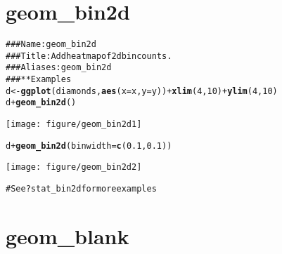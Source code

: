 \documentclass[a4paper,titlepage]{tufte-handout}\usepackage{graphicx, color}
\makeatletter
\def\maxwidth{ %
  \ifdim\Gin@nat@width>\linewidth
    \linewidth
  \else
    \Gin@nat@width
  \fi
}
\newcommand{\hlfunctioncall}[1]{\textcolor[rgb]{0.501960784313725,0,0.329411764705882}{\textbf{#1}}}%
\newcommand{\hlcomment}[1]{\textcolor[rgb]{0.180392156862745,0.6,0.341176470588235}{#1}}%
\newenvironment{kframe}{%
 \def\at@end@of@kframe{}%
 \ifinner\ifhmode%
  \def\at@end@of@kframe{\end{minipage}}%
  \begin{minipage}{\columnwidth}%
 \fi\fi%
 \def\FrameCommand##1{\hskip\@totalleftmargin \hskip-\fboxsep
 \colorbox{shadecolor}{##1}\hskip-\fboxsep
     \hskip-\linewidth \hskip-\@totalleftmargin \hskip\columnwidth}%
 \MakeFramed {\advance\hsize-\width
   \@totalleftmargin\z@ \linewidth\hsize
   \@setminipage}}%
 {\par\unskip\endMakeFramed%
 \at@end@of@kframe}
\newenvironment{knitrout}{}{} %
\makeatother
\begin{document}
\section{geom\_bin2d}

\begin{knitrout}
\color{fgcolor}\begin{kframe}
\begin{alltt}
\hlcomment{### Name: geom_bin2d}
\hlcomment{### Title: Add heatmap of 2d bin counts.}
\hlcomment{### Aliases: geom_bin2d}
\hlcomment{### ** Examples}
d <- \hlfunctioncall{ggplot}(diamonds, \hlfunctioncall{aes}(x = x, y = y)) + \hlfunctioncall{xlim}(4,10) + \hlfunctioncall{ylim}(4,10)
d + \hlfunctioncall{geom_bin2d}()
\end{alltt}
\end{kframe}\texttt{[image: figure/geom\_bin2d1]} \begin{kframe}\begin{alltt}
d + \hlfunctioncall{geom_bin2d}(binwidth = \hlfunctioncall{c}(0.1, 0.1))
\end{alltt}
\end{kframe}\texttt{[image: figure/geom\_bin2d2]} \begin{kframe}\begin{alltt}
\hlcomment{# See ?stat_bin2d for more examples}
\end{alltt}
\end{kframe}
\end{knitrout}


\section{geom\_blank}
\end{document}
